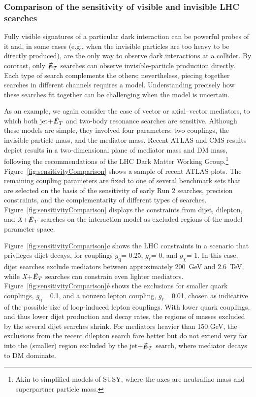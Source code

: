 \documentclass{ar-1col}
\newcommand{\chiDM}{\ensuremath{\chi}\xspace}
\newcommand{\IP}{invisible particle}
\newcommand{\gDM}{\ensuremath{g_{\chiDM}}\xspace}
\newcommand{\gdm}{\gDM}
\newcommand{\gl}{$g_{\ell}$\xspace}
\newcommand{\gq}{$g_{\mathrm{q}}$\xspace}
\newcommand{\MET}{\ensuremath{\slashed{E}_T}\xspace}
\begin{document}
\subsubsection{Comparison of the sensitivity of visible and invisible LHC searches}\label{sub:comparisonVisibleInvisible}

Fully visible signatures of a particular dark interaction can be
powerful probes of it and, in some cases (e.g., when the {\IP}s
are too heavy to be directly produced), are the only way to observe
dark interactions at a collider. By contrast, only \MET
searches can observe invisible-particle production directly.
Each type of search complements the others; nevertheless, piecing
together searches in different channels requires a model.
Understanding precisely how these searches fit together can be
challenging when the model is uncertain.

As an example, we again consider the case of vector or
axial--vector mediators, to which both jet+\MET and two-body
resonance searches are sensitive. Although these models are simple,
they involved four parameters: two couplings, the invisible-particle
mass, and the mediator mass. Recent ATLAS and CMS results depict
results in a two-dimensional plane of mediator mass and DM
mass, following the recommendations of the LHC Dark Matter Working
Group.\footnote{Akin to simplified models of SUSY, where the axes
are neutralino mass and superpartner particle mass.}
Figure~\ref{fig:sensitivityComparison} shows a sample of
recent ATLAS plots. The remaining coupling parameters are
fixed to one of several benchmark sets that are selected on the basis of the
sensitivity of early Run 2 searches, precision constraints, and
the complementarity of different types of searches. Figure~\ref{fig:sensitivityComparison} displays the
constraints from dijet, dilepton, and \textit{X}+\MET searches on the
interaction model as excluded regions of the model
parameter space.

Figure~\ref{fig:sensitivityComparison}\textit{a} shows the LHC constraints
in a scenario that privileges dijet decays, for couplings
\gq = 0.25, \gl = 0, and \gdm = 1. 
In this case, dijet searches exclude
mediators between approximately 200~GeV and 2.6~TeV, while \textit{X}+\MET searches
can constrain even lighter mediators. 
Figure~\ref{fig:sensitivityComparison}\textit{b} shows the
exclusions for smaller quark couplings, \gq = 0.1, and a nonzero
lepton coupling, \gl = 0.01, chosen as indicative of the possible
size of loop-induced lepton couplings. With lower quark couplings,
and thus lower dijet production and decay rates, the regions of
masses excluded by the several dijet searches shrink. For
mediators heavier than 150 GeV, the exclusions from the recent
dilepton search fare better but do not extend very far into the
(smaller) region excluded by the jet+\MET search, where mediator
decays to DM dominate.
\end{document}
